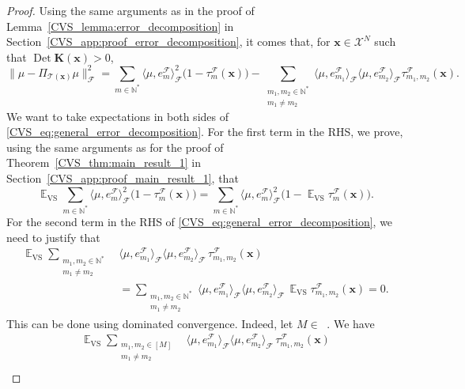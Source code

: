 \documentclass[twoside,11pt]{book}
\numberwithin{theorem}{chapter}
\numberwithin{definition}{chapter}
\numberwithin{proposition}{chapter}
\numberwithin{corollary}{chapter}
\numberwithin{example}{chapter}
\numberwithin{lemma}{chapter}
\numberwithin{assumption}{chapter}
\numberwithin{equation}{chapter}
\numberwithin{figure}{chapter}
\DeclareMathOperator{\Det}{Det}
\DeclareMathOperator{\VS}{\mathrm{VS}}
\DeclareMathOperator{\EX}{\mathbb{E}}
\DeclareMathOperator{\F}{\mathcal{F}}
\DeclareMathOperator{\Ns}{\mathbb{N}^{*}}
\begin{document}
\begin{proof}
Using the same arguments as in the proof of Lemma~\ref{CVS_lemma:error_decomposition} in Section~\ref{CVS_app:proof_error_decomposition}, it comes that,
for $\bm{x} \in \mathcal{X}^{N}$ such that $\Det \bm{K}(\bm{x}) > 0$,
\begin{equation}\label{CVS_eq:general_error_decomposition}
\|\mu - \Pi_{\mathcal{T}(\bm{x})} \mu\|_{\F}^{2}  = \sum\limits_{m \in \mathbb{N}^{*}} \langle \mu, e_{m}^{\F} \rangle_{\F}^{2}\bigg(1- \tau_{m}^{\F}(\bm{x})\bigg) - \sum\limits_{\substack{m_{1},m_{2} \in \mathbb{N}^{*} \\ m_{1} \neq m_{2}}}  \langle \mu, e_{m_{1}}^{\F} \rangle_{\F} \langle \mu, e_{m_{2}}^{\F} \rangle_{\F} \tau_{m_{1},m_{2}}^{\F}(\bm{x}).
\end{equation}
We want to take expectations in both sides of \eqref{CVS_eq:general_error_decomposition}. For the first term in the RHS, we prove, using the same arguments as for the proof of Theorem~\ref{CVS_thm:main_result_1} in Section~\ref{CVS_app:proof_main_result_1}, that
\begin{equation}\label{CVS_eq:EX_VS_lvs_interpolation}
\EX_{\VS} \sum\limits_{m \in \mathbb{N}^{*}} \langle \mu, e_{m}^{\F} \rangle_{\F}^{2}\bigg(1- \tau_{m}^{\F}(\bm{x})\bigg) = \sum\limits_{m \in \mathbb{N}^{*}} \langle \mu, e_{m}^{\F} \rangle_{\F}^{2}\bigg(1- \EX_{\VS}\tau_{m}^{\F}(\bm{x})\bigg).
\end{equation}
For the second term in the RHS of \eqref{CVS_eq:general_error_decomposition}, we need to justify that
\begin{align}
\EX_{\VS} \sum\limits_{\substack{m_{1},m_{2} \in \mathbb{N}^{*} \\ m_{1} \neq m_{2}}}  &\langle \mu, e_{m_{1}}^{\F} \rangle_{\F} \langle \mu, e_{m_{2}}^{\F} \rangle_{\F} \, \tau_{m_{1},m_{2}}^{\F}(\bm{x}) \nonumber\\
& = \sum\limits_{\substack{m_{1},m_{2} \in \mathbb{N}^{*} \\ m_{1} \neq m_{2}}}  \langle \mu, e_{m_{1}}^{\F} \rangle_{\F} \langle \mu, e_{m_{2}}^{\F} \rangle_{\F} \,\EX_{\VS}\tau_{m_{1},m_{2}}^{\F}(\bm{x}) = 0.
\label{CVS_eq:EX_VS_cross_lvs_interpolation}
\end{align}
This can be done using dominated convergence. Indeed, let $M \in \Ns$. We have
\begin{align}
\EX_{\VS} \sum\limits_{\substack{m_{1},m_{2} \in [M] \\ m_{1} \neq m_{2}}}  &\langle \mu, e_{m_{1}}^{\F} \rangle_{\F} \langle \mu, e_{m_{2}}^{\F} \rangle_{\F} \,\tau_{m_{1},m_{2}}^{\F}(\bm{x}) \nonumber\\

\end{align}
\end{proof}
\end{document}
